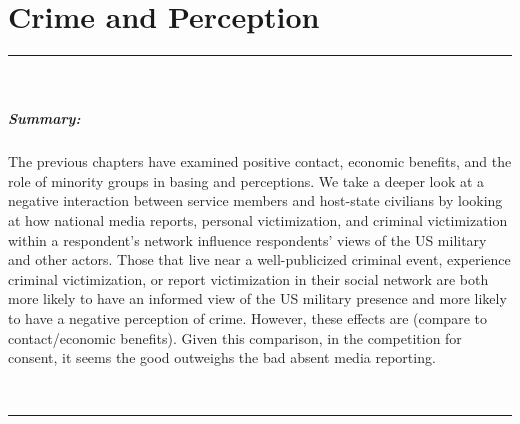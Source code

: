 \chapter{Crime and Perception \label{cha:crimes}}
\doublespacing




\vspace*{-0.5cm}
\rule{\linewidth}{0.10pt} \\[-1cm]
{\footnotesize\paragraph{Summary:}  The previous chapters have examined positive contact, economic benefits, and the role of minority groups in basing and perceptions. We take a deeper look at a negative interaction between service members and host-state civilians by looking at how national media reports, personal victimization, and criminal victimization within a respondent's network influence respondents' views of the US military and other actors. Those that live near a well-publicized criminal event, experience criminal victimization, or report victimization in their social network are both more likely to have an informed view of the US military presence and more likely to have a negative perception of crime. However, these effects are (compare to contact/economic benefits). Given this comparison, in the competition for consent, it seems the good outweighs the bad absent media reporting.} 
\\[-0.5cm] 
\rule{\linewidth}{0.10pt}

\vspace*{0.5cm}



